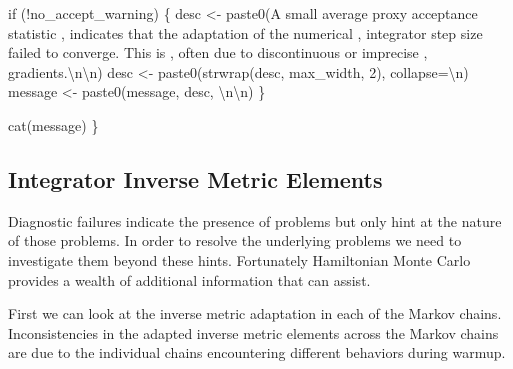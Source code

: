 \documentclass[
  letterpaper,
  DIV=11,
  numbers=noendperiod]{scrartcl}
\newenvironment{Shaded}{\begin{snugshade}}{\end{snugshade}}
\newcommand{\AttributeTok}[1]{\textcolor[rgb]{0.40,0.45,0.13}{#1}}
\newcommand{\ControlFlowTok}[1]{\textcolor[rgb]{0.00,0.23,0.31}{#1}}
\newcommand{\DecValTok}[1]{\textcolor[rgb]{0.68,0.00,0.00}{#1}}
\newcommand{\FunctionTok}[1]{\textcolor[rgb]{0.28,0.35,0.67}{#1}}
\newcommand{\NormalTok}[1]{\textcolor[rgb]{0.00,0.23,0.31}{#1}}
\newcommand{\OtherTok}[1]{\textcolor[rgb]{0.00,0.23,0.31}{#1}}
\newcommand{\SpecialCharTok}[1]{\textcolor[rgb]{0.37,0.37,0.37}{#1}}
\newcommand{\StringTok}[1]{\textcolor[rgb]{0.13,0.47,0.30}{#1}}
\begin{document}
\begin{Shaded}
\begin{Highlighting}[]
  \ControlFlowTok{if}\NormalTok{ (}\SpecialCharTok{!}\NormalTok{no\_accept\_warning) \{}
\NormalTok{    desc }\OtherTok{\textless{}{-}} \FunctionTok{paste0}\NormalTok{(}\StringTok{\textquotesingle{}A small average proxy acceptance statistic \textquotesingle{}}\NormalTok{,}
                   \StringTok{\textquotesingle{}indicates that the adaptation of the numerical \textquotesingle{}}\NormalTok{,}
                   \StringTok{\textquotesingle{}integrator step size failed to converge.  This is \textquotesingle{}}\NormalTok{,}
                   \StringTok{\textquotesingle{}often due to discontinuous or imprecise \textquotesingle{}}\NormalTok{,}
                   \StringTok{\textquotesingle{}gradients.}\SpecialCharTok{\textbackslash{}n\textbackslash{}n}\StringTok{\textquotesingle{}}\NormalTok{)}
\NormalTok{    desc }\OtherTok{\textless{}{-}} \FunctionTok{paste0}\NormalTok{(}\FunctionTok{strwrap}\NormalTok{(desc, max\_width, }\DecValTok{2}\NormalTok{), }\AttributeTok{collapse=}\StringTok{\textquotesingle{}}\SpecialCharTok{\textbackslash{}n}\StringTok{\textquotesingle{}}\NormalTok{)}
\NormalTok{    message }\OtherTok{\textless{}{-}} \FunctionTok{paste0}\NormalTok{(message, desc, }\StringTok{\textquotesingle{}}\SpecialCharTok{\textbackslash{}n\textbackslash{}n}\StringTok{\textquotesingle{}}\NormalTok{)}
\NormalTok{  \}}

  \FunctionTok{cat}\NormalTok{(message)}
\NormalTok{\}}
\end{Highlighting}
\end{Shaded}

\hypertarget{integrator-inverse-metric-elements}{%
\subsection{Integrator Inverse Metric
Elements}\label{integrator-inverse-metric-elements}}

Diagnostic failures indicate the presence of problems but only hint at
the nature of those problems. In order to resolve the underlying
problems we need to investigate them beyond these hints. Fortunately
Hamiltonian Monte Carlo provides a wealth of additional information that
can assist.

First we can look at the inverse metric adaptation in each of the Markov
chains. Inconsistencies in the adapted inverse metric elements across
the Markov chains are due to the individual chains encountering
different behaviors during warmup.
\end{document}
